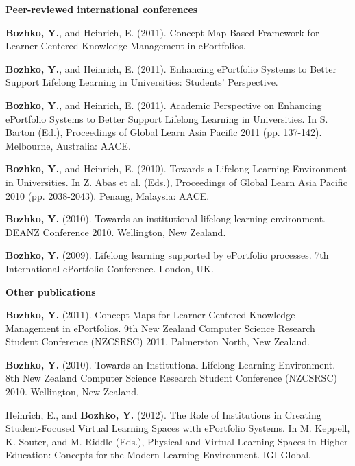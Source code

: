 \LARGE \textbf{Peer-reviewed international conferences}

\normalsize
\textbf{Bozhko, Y.}, and Heinrich, E. (2011). Concept Map-Based Framework for
Learner-Centered Knowledge Management in ePortfolios.

\textbf{Bozhko, Y.}, and Heinrich, E. (2011). Enhancing ePortfolio Systems to
Better Support Lifelong Learning in Universities: Students' Perspective.

\textbf{Bozhko, Y.}, and Heinrich, E. (2011). Academic Perspective on Enhancing
ePortfolio Systems to Better Support Lifelong Learning in Universities. In S.
Barton (Ed.), Proceedings of Global Learn Asia Pacific 2011 (pp. 137-142).
Melbourne, Australia: AACE.

﻿\textbf{Bozhko, Y.}, and Heinrich, E. (2010). Towards a Lifelong Learning
Environment in Universities. In Z. Abas et al. (Eds.), Proceedings of Global Learn Asia Pacific
2010 (pp. 2038-2043). Penang, Malaysia: AACE. 

\textbf{Bozhko, Y.} (2010). Towards an institutional lifelong learning
environment. DEANZ Conference 2010. Wellington, New Zealand.

\textbf{Bozhko, Y.} (2009). Lifelong learning supported by ePortfolio processes.
7th International ePortfolio Conference. London, UK.

\LARGE \textbf{Other publications}

\normalsize
\textbf{Bozhko, Y.} (2011). Concept Maps for Learner-Centered Knowledge
Management in ePortfolios. 9th New Zealand Computer Science Research Student Conference
(NZCSRSC) 2011. Palmerston North, New Zealand.

\textbf{Bozhko, Y.} (2010). Towards an Institutional Lifelong Learning
Environment. 8th New Zealand Computer Science Research Student Conference (NZCSRSC) 2010.
Wellington, New Zealand.

﻿Heinrich, E., and \textbf{Bozhko, Y.} (2012). The Role of Institutions in
Creating Student-Focused Virtual Learning Spaces with ePortfolio Systems. In M. Keppell,
K. Souter, and M. Riddle (Eds.), Physical and Virtual Learning Spaces in Higher
Education: Concepts for the Modern Learning Environment. IGI Global.



